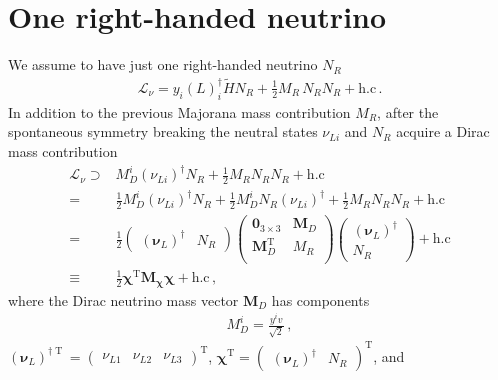 \section{One right-handed neutrino}
We assume to have just one right-handed neutrino $N_R$ 
\begin{align}
  \mathcal{L}_{\nu}=y_{i} \left( L \right)^{\dagger}_i\widetilde{H}  N_R 
  +\tfrac{1}{2} M_R\, N_R  N_R + \text{h.c}\,.
\end{align}
In addition to the previous Majorana mass contribution $M_R$, after the spontaneous symmetry breaking the neutral states $\nu_{Li}$ and $N_R$  acquire a Dirac mass contribution
\begin{align}
  \mathcal{L}_{\nu}\supset & M_D^{i} \left( \nu_{Li} \right)^{\dagger} N_R +\frac{1}{2} M_R N_R N_R +\text{h.c} \nonumber\\
  =&  \frac{1}{2}M_D^{i} \left( \nu_{Li} \right)^{\dagger} N_R
     +\frac{1}{2}M_D^{i} N_R\left( \nu_{Li} \right)^{\dagger} +\frac{1}{2} M_R N_R N_R +\text{h.c} \nonumber\\
  =&\frac{1}{2}\begin{pmatrix} \left( \boldsymbol{\nu}_{L} \right)^{\dagger}  & N_R  \end{pmatrix}
 \begin{pmatrix}
   \mathbf{0}_{3 \times 3} &            \boldsymbol{M}_D \\
   \boldsymbol{M}_D^{\operatorname{T}} & M_R \\
 \end{pmatrix}
\begin{pmatrix} \left( \boldsymbol{\nu}_{L} \right)^{\dagger}  \\
    N_R  \end{pmatrix}+\text{h.c} \nonumber\\
  \equiv&\frac{1}{2} \boldsymbol{\chi}^{\operatorname{T}} \boldsymbol{M_{\chi}} \boldsymbol{\chi}+\text{h.c}\,,
\end{align}
where the Dirac neutrino mass vector $\boldsymbol{M}_D$ has components
\begin{align}
  M_D^i=\frac{y^i v}{\sqrt{2}}\,,
\end{align}
$\left( \boldsymbol{\nu}_{L} \right)^{\dagger\operatorname{T}}=
\begin{pmatrix}\nu_{L1} & \nu_{L2} & \nu_{L3} \end{pmatrix}^{\operatorname{T}}$, $\boldsymbol{\chi}^{\operatorname{T}}=\begin{pmatrix} \left( \boldsymbol{\nu}_L \right)^{\dagger}  & N_R  \end{pmatrix}^{\operatorname{T}}$, and
